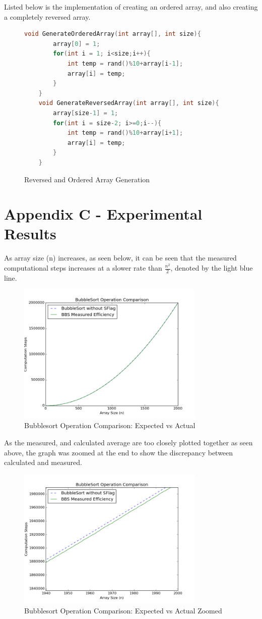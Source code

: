 \documentclass[]{article}
\begin{document}
Listed below is the implementation of creating an ordered array, and also creating a completely reversed array.
\begin{figure}[H]\label{ReversedOrdered}
	\caption{Reversed and Ordered Array Generation}
	\begin{lstlisting}[language=c++]
	void GenerateOrderedArray(int array[], int size){
		array[0] = 1;
		for(int i = 1; i<size;i++){
			int temp = rand()%10+array[i-1];
			array[i] = temp;
		}
	}
	void GenerateReversedArray(int array[], int size){
		array[size-1] = 1;
		for(int i = size-2; i>=0;i--){
			int temp = rand()%10+array[i+1];
			array[i] = temp;
		}
	}
	\end{lstlisting}
\end{figure}
\section{Appendix C - Experimental Results}
As array size (n) increases, as seen below, it can be seen that the measured computational steps increases at a slower rate than $\frac{n^2}{2}$, denoted by the light blue line. 
\begin{figure}[H]\label{MeasuredRandom}
	\centering
	\caption{Bubblesort Operation Comparison: Expected vs Actual}
	\includegraphics[width=0.8\textwidth]{Random.png}
\end{figure}
As the measured, and calculated average are too closely plotted together as seen above, the graph was zoomed at the end to show the discrepancy between calculated and measured. 
\begin{figure}[H]\label{MeasuredRandomZoom}
	\centering
	\caption{Bubblesort Operation Comparison: Expected vs Actual Zoomed}
	\includegraphics[width=0.8\textwidth]{RandomZoom.png}
\end{figure}
\end{document}
